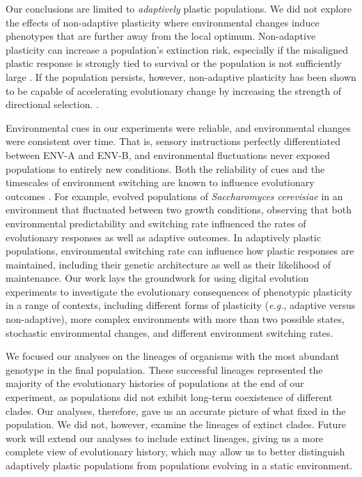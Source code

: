 Our conclusions are limited to \textit{adaptively} plastic populations.
We did not explore the effects of non-adaptive plasticity where environmental changes induce phenotypes that are further away from the local optimum.
Non-adaptive plasticity can increase a population's extinction risk, especially if the misaligned plastic response is strongly tied to survival or the population is not sufficiently large \citep{gomulkiewicz_when_1995,chevin_adaptation_2010}.
If the population persists, however, non-adaptive plasticity has been shown to be capable of accelerating evolutionary change by increasing the strength of directional selection. \citep{ghalambor_non-adaptive_2015}.

Environmental cues in our experiments were reliable, and environmental changes were consistent over time. 
That is, sensory instructions perfectly differentiated between ENV-A and ENV-B, and environmental fluctuations never exposed populations to entirely new conditions.
Both the reliability of cues and the timescales of environment switching are known to influence evolutionary outcomes \citep{li_digital_2004,boyer_adaptation_2021}. %
For example, \cite{boyer_adaptation_2021} evolved populations of \textit{Saccharomyces cerevisiae} in an environment that fluctuated between two growth conditions, observing that both environmental predictability and switching rate influenced the rates of evolutionary responses as well as adaptive outcomes. 
In adaptively plastic populations, environmental switching rate can influence how plastic responses are maintained, including their genetic architecture as well as their likelihood of maintenance. 
Our work lays the groundwork for using digital evolution experiments to investigate the evolutionary consequences of phenotypic plasticity in a range of contexts, including different forms of plasticity (\textit{e.g.}, adaptive versus non-adaptive), more complex environments with more than two possible states, stochastic environmental changes, and different environment switching rates.

We focused our analyses on the lineages of organisms with the most abundant genotype in the final population.
These successful lineages represented the majority of the evolutionary histories of populations at the end of our experiment, as populations did not exhibit long-term coexistence of different clades.
Our analyses, therefore, gave us an accurate picture of what fixed in the population.
We did not, however, examine the lineages of extinct clades.
Future work will extend our analyses to include extinct lineages, giving us a more complete view of evolutionary history, which may allow us to better distinguish adaptively plastic populations from populations evolving in a static environment. 

